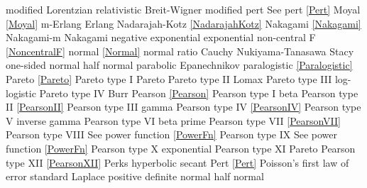 modified Lorentzian				\dotfill	relativistic Breit-Wigner					%
modified pert					\dotfill	See pert \eqref{Pert}					\ncite	%
Moyal						\dotfill	\eqref{Moyal}						\ncite	
m-Erlang						\dotfill	Erlang 							\ncite	%
%
Nadarajah-Kotz					\dotfill	\eqref{NadarajahKotz}				\mcite{\self}	%
Nakagami 					\dotfill	\eqref{Nakagami} 					\ncite	%
Nakagami-m 					\dotfill	Nakagami 						\ncite   	%
negative exponential				\dotfill	exponential 						\ncite	%
non-central F					\dotfill		\eqref{NoncentralF}				\ncite	%
normal 						\dotfill	\eqref{Normal}						\ncite	%
normal ratio  					\dotfill	Cauchy 							\ncite	%
Nukiyama-Tanasawa 			\dotfill	Stacy 							   	%
%
one-sided normal  				\dotfill	half normal						\ncite	%
parabolic						\dotfill	Epanechnikov						\ncite
paralogistic					\dotfill	\eqref{Paralogistic} 					\ncite	%
Pareto						\dotfill	\eqref{Pareto}						\ncite	%
Pareto type I					\dotfill	Pareto							\ncite	%
Pareto type II					\dotfill	Lomax 							\ncite	%
Pareto type III					\dotfill	log-logistic						\ncite	%
Pareto type IV					\dotfill	Burr								\ncite	%
Pearson			 			\dotfill	\eqref{Pearson}						\ncite	%
Pearson type I					\dotfill	beta 								\ncite	%
Pearson type II					\dotfill	\eqref{PearsonII}					\ncite	%
Pearson type III   				\dotfill	gamma 							\ncite	%
Pearson type IV   				\dotfill	\eqref{PearsonIV} 					\ncite	%
Pearson type V    				\dotfill	inverse gamma						\ncite	%
Pearson type VI				\dotfill	beta prime 						\ncite	%
Pearson type VII				\dotfill	\eqref{PearsonVII} 					\ncite	%
Pearson type VIII				\dotfill	See power function \eqref{PowerFn}		\ncite	%
Pearson type IX				\dotfill	See power function \eqref{PowerFn}		\ncite	%
Pearson type X    				\dotfill	exponential						\ncite	%
Pearson type XI    				\dotfill	Pareto							   	%
Pearson type XII 				\dotfill	\eqref{PearsonXII}					\ncite	%
Perks						\dotfill	hyperbolic secant 					\ncite	%
Pert							\dotfill	\eqref{Pert} 						\ncite	%
Poisson's first law of error			\dotfill	standard Laplace					\ncite	%
positive definite normal 			\dotfill	half normal 						\ncite 	%
